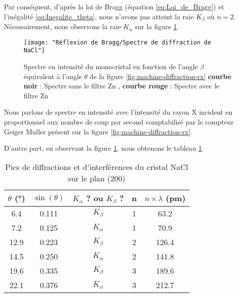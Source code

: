 Par conséquent, d'après la loi de Bragg (équation \ref{eq:Loi_de_Bragg}) et l'inégalité \ref{eq:Inegalite_theta}, nous n'avons pas atteint la raie $K_{\beta}$ où $n=2$. Nécessairement, nous observons la raie $K_{\alpha}$ sur la figure \ref{fig:spectre-de-diffraction-de-nacl}.

\newpage
\begin{figure}
	\centering
	\texttt{[image: "Réflexion de Bragg/Spectre de diffraction de NaCl"]}
	\caption{\centering Spectre en intensité du monocristal en fonction de l'angle $\beta$ équivalent à l'angle $\theta$ de la figure \ref{fig:machine-diffraction-rx} \textbf{courbe noir} : Spectre sans le filtre Zn , {\color{red}\textbf{courbe rouge}} : Spectre avec le filtre Zn }
	\label{fig:spectre-de-diffraction-de-nacl}
\end{figure}


\begin{flushleft}
	Nous parlons de spectre en intensité avec l'intensité du rayon X incident en proportionnel aux nombre de coup par second comptabilisé par le compteur Geiger Muller présent sur la figure \ref{fig:machine-diffraction-rx}.
	
	D'autre part, en observant la figure \ref{fig:spectre-de-diffraction-de-nacl}, nous obtenons le tableau \ref{tab:Pic_de_diffraction_et_d'interférence_du_cristal_NaCl_sur_le_plan_200}.
\end{flushleft}

\begin{table}[h!]
	\centering
	\begin{tabular}{|c|c|c|c|c|}
		\hline
		$\theta$ (°) & $\sin(\theta)$ &$K_{\alpha}$ ? ou $K_{\beta}$ ? & n & $n \times \lambda $ (pm) \\ \hline
		6.4       & 0.111      & $K_{\beta}$                     & 1 & 63.2 \\ \hline
		7.2       & 0.125      &$K_{\alpha}$                    & 1 & 70.9 \\ \hline
		12.9      & 0.223      & $K_{\beta}$                     & 2  & 126.4\\ \hline
		14.5      & 0.250      &$K_{\alpha}$                    & 2  & 141.8\\ \hline
		19.6      & 0.335      & $K_{\beta}$                     & 3  & 189.6\\ \hline
		22.1      & 0.376      &$K_{\alpha}$                    & 3  & 212.7 \\ \hline
	\end{tabular}	
	\caption{Pics de diffractions et d'interférences du cristal NaCl sur le plan (200)}
	\label{tab:Pic_de_diffraction_et_d'interférence_du_cristal_NaCl_sur_le_plan_200}
\end{table}



